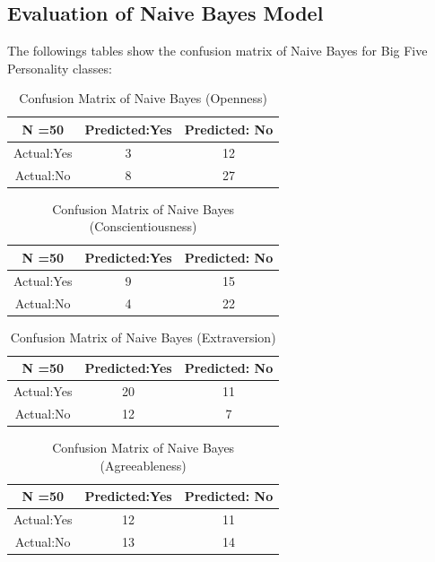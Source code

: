 \documentclass[journal]{IEEEtran}
\begin{document}
\subsection{Evaluation of Naive Bayes Model}

The followings tables show the confusion matrix of Naive Bayes for Big Five Personality classes:
\begin{table}[!ht]
\centering
\begin{tabular}{ |c|c|c| }
 \hline
 N =50 & Predicted:Yes & Predicted: No \\
 \hline
 Actual:Yes&3 & 12 \\
 \hline
 Actual:No&8 & 27 \\
 \hline
\end{tabular}
\caption{Confusion Matrix of Naive Bayes (Openness)}

\end{table}

\begin{table}[!ht]
\centering
\begin{tabular}{ |c|c|c| }
 \hline
 N =50 & Predicted:Yes & Predicted: No \\
 \hline
 Actual:Yes&9 & 15 \\
 \hline
 Actual:No&4 & 22 \\
 \hline
\end{tabular}
\caption{Confusion Matrix of Naive Bayes (Conscientiousness)}
\end{table}

\begin{table}[!ht]
\centering
\begin{tabular}{ |c|c|c| }
 \hline
 N =50 & Predicted:Yes & Predicted: No \\
 \hline
 Actual:Yes&20 & 11 \\
 \hline
 Actual:No&12 & 7 \\
 \hline
\end{tabular}
 \caption{Confusion Matrix of Naive Bayes (Extraversion)}
\end{table}

\begin{table}[!ht]
\centering
\begin{tabular}{ |c|c|c| }
 \hline
 N =50 & Predicted:Yes & Predicted: No \\
 \hline
 Actual:Yes&12 & 11 \\
 \hline
 Actual:No&13 & 14 \\
 \hline
\end{tabular}
 \caption{Confusion Matrix of Naive Bayes (Agreeableness)}
\end{table}
\end{document}
